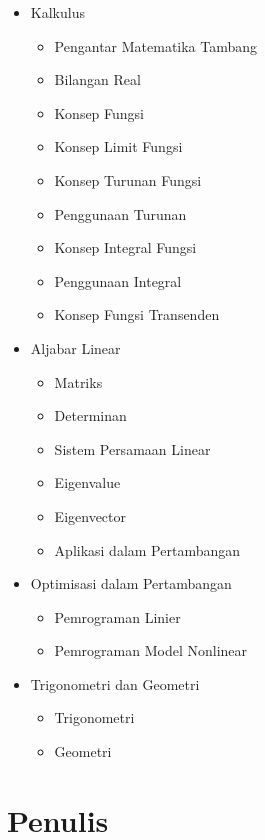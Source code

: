 \documentclass[
]{book}
\providecommand{\tightlist}{%
  \setlength{\itemsep}{0pt}\setlength{\parskip}{0pt}}
\begin{document}
\begin{itemize}
\tightlist
\item
  Kalkulus

  \begin{itemize}
  \tightlist
  \item
    Pengantar Matematika Tambang
  \item
    Bilangan Real
  \item
    Konsep Fungsi
  \item
    Konsep Limit Fungsi
  \item
    Konsep Turunan Fungsi
  \item
    Penggunaan Turunan
  \item
    Konsep Integral Fungsi
  \item
    Penggunaan Integral
  \item
    Konsep Fungsi Transenden
  \end{itemize}
\item
  Aljabar Linear

  \begin{itemize}
  \tightlist
  \item
    Matriks
  \item
    Determinan
  \item
    Sistem Persamaan Linear
  \item
    Eigenvalue
  \item
    Eigenvector
  \item
    Aplikasi dalam Pertambangan
  \end{itemize}
\item
  Optimisasi dalam Pertambangan

  \begin{itemize}
  \tightlist
  \item
    Pemrograman Linier
  \item
    Pemrograman Model Nonlinear
  \end{itemize}
\item
  Trigonometri dan Geometri

  \begin{itemize}
  \tightlist
  \item
    Trigonometri
  \item
    Geometri
  \end{itemize}
\end{itemize}

\section*{Penulis}\label{penulis}
\end{document}
